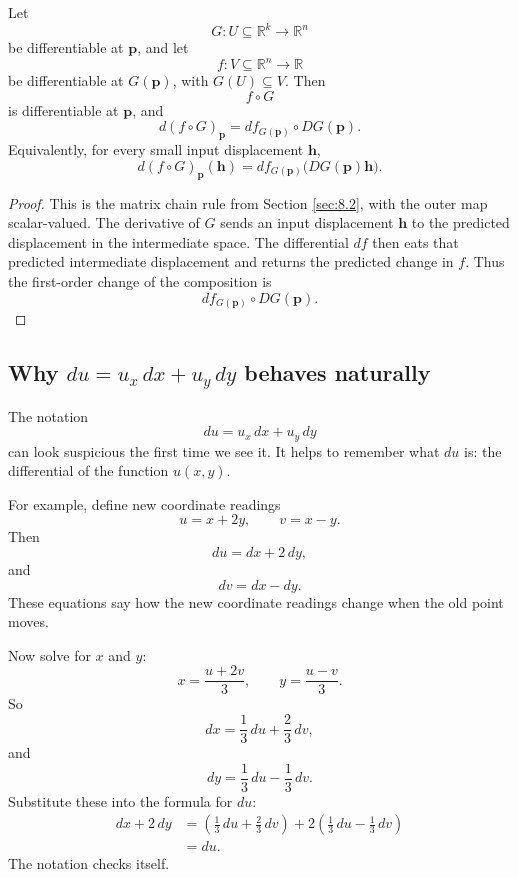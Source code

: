 \begin{theorem}
Let
\[
    G:U\subseteq\mathbb R^k\to\mathbb R^n
\]
be differentiable at \(\mathbf p\), and let
\[
    f:V\subseteq\mathbb R^n\to\mathbb R
\]
be differentiable at \(G(\mathbf p)\), with \(G(U)\subseteq V\).  Then
\[
    f\circ G
\]
is differentiable at \(\mathbf p\), and
\[
\boxed{
    d(f\circ G)_{\mathbf p}
    =
    df_{G(\mathbf p)}\circ DG(\mathbf p).
}
\]
Equivalently, for every small input displacement \(\mathbf h\),
\[
\boxed{
    d(f\circ G)_{\mathbf p}(\mathbf h)
    =
    df_{G(\mathbf p)}\bigl(DG(\mathbf p)\mathbf h\bigr).
}
\]
\end{theorem}

\begin{proof}
This is the matrix chain rule from Section \ref{sec:8.2}, with the outer map scalar-valued.
The derivative of \(G\) sends an input displacement \(\mathbf h\) to the predicted
displacement in the intermediate space.  The differential \(df\) then eats that predicted
intermediate displacement and returns the predicted change in \(f\).  Thus the first-order
change of the composition is
\[
    df_{G(\mathbf p)}\circ DG(\mathbf p).
\]
\end{proof}

\subsection{Why \texorpdfstring{\(du=u_x\,dx+u_y\,dy\)}{du = ux dx + uy dy} behaves naturally}

The notation
\[
    du=u_x\,dx+u_y\,dy
\]
can look suspicious the first time we see it.  It helps to remember what \(du\) is:
the differential of the function \(u(x,y)\).

For example, define new coordinate readings
\[
    u=x+2y,
    \qquad
    v=x-y.
\]
Then
\[
    du=dx+2\,dy,
\]
and
\[
    dv=dx-dy.
\]
These equations say how the new coordinate readings change when the old point moves.

Now solve for \(x\) and \(y\):
\[
    x=\frac{u+2v}{3},
    \qquad
    y=\frac{u-v}{3}.
\]
So
\[
    dx=\frac13\,du+\frac23\,dv,
\]
and
\[
    dy=\frac13\,du-\frac13\,dv.
\]
Substitute these into the formula for \(du\):
\[
\begin{aligned}
    dx+2\,dy
    &=
    \left(\frac13\,du+\frac23\,dv\right)
    +
    2\left(\frac13\,du-\frac13\,dv\right)\\
    &=
    du.
\end{aligned}
\]
The notation checks itself.

